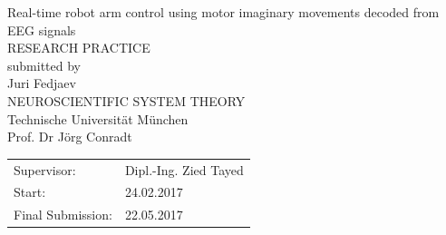 \documentclass[a4paper,oneside, openright,12pt]{report}
\begin{document}
\pagestyle{empty}
\enlargethispage{4.5cm} %
\begin{center}
\phantom{u}
\vspace{0.5cm}
\Huge{\sc Real-time robot arm control using motor imaginary movements decoded from EEG
	signals}\\
\vspace{1.5cm}
		\large{
			RESEARCH PRACTICE\\%
			\vspace{0.4cm}
			submitted by\\
			Juri Fedjaev\\
			\vspace{1.5cm}
			NEUROSCIENTIFIC SYSTEM THEORY\\
			Technische Universit\"at M\"unchen\\
			\vspace{0.3cm}
			Prof. Dr J\"org Conradt\\
		}
\end{center}
\vspace{5.5cm}
\begin{tabular}{ll}
Supervisor: &Dipl.-Ing. Zied Tayed \\
Start: & 24.02.2017  \\
Final Submission: &  22.05.2017 \\
\end{tabular}




\end{document}
